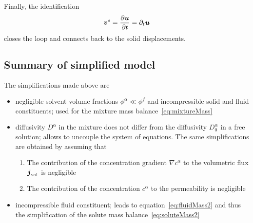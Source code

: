 \documentclass[a4paper,DIV=12,10pt]{scrartcl}
\newcommand{\U}[0]{\vek{u}}
\newcommand{\V}[0]{\vek{v}}
\begin{document}
Finally, the identification 
\begin{equation}
  \label{eq:solidVelocity}
  \V^s = \frac{\partial \U}{\partial t} = \partial_t \U
\end{equation}
closes the loop and connects back to the solid displacements. 

\subsection{Summary of simplified model} 

The simplifications made above are
\begin{itemize}
\item negligible solvent volume fractions $\phi^\alpha \ll \phi^f$ and
  incompressible solid and fluid constituents; used for
  the mixture mass balance~\eqref{eq:mixtureMass}
\item diffusivity $D^\alpha$ in the mixture does not differ from the
  diffusivity $D^\alpha_0$ in a free solution; allows to uncouple the system
  of equations. The same simplifications are obtained by assuming that 
  \begin{enumerate}
  \item The contribution of the concentration gradient $\nabla c^\alpha$ to
    the volumetric flux $\boldsymbol{j}_{\text{vol}}$ is negligible
  \item The contribution of the concentration $c^\alpha$ to the permeability
    is negligible
  \end{enumerate}
\item incompressible fluid constituent; leads to
  equation~\eqref{eq:fluidMass2} and thus the simplification of the solute
  mass balance~\eqref{eq:soluteMass2}
\end{itemize}
\end{document}
